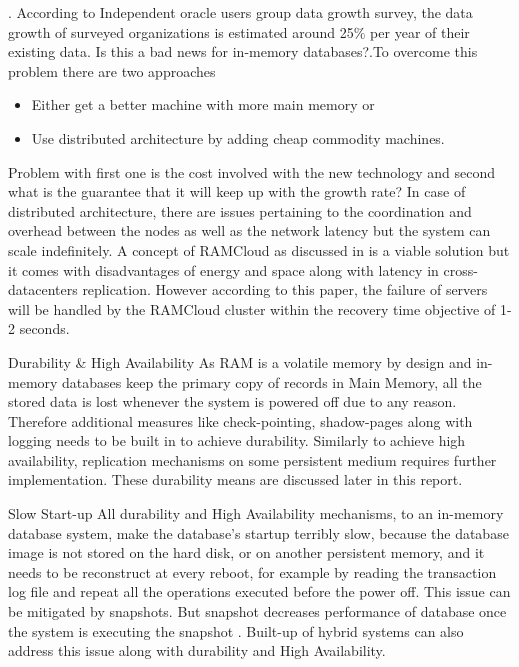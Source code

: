 \documentclass[12pt]{article} %
\begin{document}
\begin{description}
\item[Scalability]. 
According to Independent oracle users group data growth survey\cite{oracleDataGrowth}, the data growth of surveyed organizations is estimated around 25\% per year of their existing data. Is this a bad news for in-memory databases?.To overcome this problem there are two approaches
\begin{itemize}
\item Either get a better machine with more main memory or
\item Use distributed architecture by adding cheap commodity machines. 
\end{itemize}
Problem with first one is the cost involved with the new technology and second what is the guarantee that it will keep up with the growth rate? In case of distributed architecture, there are issues pertaining to the coordination and overhead between the nodes as well as the network latency but the system can scale indefinitely. A concept of RAMCloud as discussed in \cite{ousterhout2010caseRamClouds} is a viable solution but it comes with disadvantages of energy and space along with latency in cross-datacenters replication. However according to this paper, the failure of servers will be handled by the RAMCloud cluster within the recovery time objective of 1-2 seconds. 


\item {Durability \& High Availability}
As RAM is a volatile memory by design and in-memory databases keep the primary copy of records in Main Memory, all the stored data is lost whenever the system is powered off due to any reason. Therefore additional measures like check-pointing, shadow-pages along with logging needs to be built in to achieve durability. Similarly to achieve high availability, replication mechanisms on some persistent medium requires further implementation. These durability means are discussed later in this report. 

\item {Slow Start-up}
All durability and High Availability mechanisms, to an in-memory database system, make the database's startup terribly slow, because the database image is not stored on the hard disk, or on another persistent memory, and it needs to be reconstruct at every reboot, for example by reading the transaction log file and repeat all the operations executed before the power off. This issue can be mitigated by snapshots. But snapshot decreases performance of database once the system is executing the snapshot \cite{Mcobject-Myths}. Built-up of hybrid systems can also address this issue along with durability and High Availability. 


\end{description}
\end{document}
